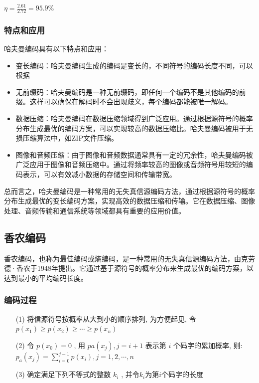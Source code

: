 \begin{multicols}{2}
\begin{itemize}
	$\eta=\frac{2.61}{2.72}=95.9\%$
\end{itemize}
\subsubsection{特点和应用}
哈夫曼编码具有以下特点和应用：
\begin{itemize}
	\item 变长编码：哈夫曼编码生成的编码是变长的，不同符号的编码长度不同，可以根据
	
	\item 无前缀码：哈夫曼编码是一种无前缀码，即任何一个编码不是其他编码的前缀。这样可以确保在解码时不会出现歧义，每个编码都能被唯一解码。
	
	\item 数据压缩：哈夫曼编码在数据压缩领域得到广泛应用。通过根据源符号的概率分布生成最优的编码方案，可以实现较高的数据压缩比。哈夫曼编码被用于无损压缩算法中，如ZIP文件压缩。
	
	\item 图像和音频压缩：由于图像和音频数据通常具有一定的冗余性，哈夫曼编码被广泛应用于图像和音频压缩中。通过将频率较高的图像或音频符号用较短的编码表示，可以有效减小数据的存储空间和传输带宽。
\end{itemize}
总而言之，哈夫曼编码是一种常用的无失真信源编码方法，通过根据源符号的概率分布生成最优的变长编码方案，实现高效的数据压缩和传输。它在数据压缩、图像处理、音频传输和通信系统等领域都具有重要的应用价值。

\subsection{香农编码}
香农编码，也称为最佳编码或熵编码，是一种常用的无失真信源编码方法，由克劳德·香农于1948年提出。它通过基于源符号的概率分布来生成最优的编码方案，以达到最小的平均编码长度。
\subsubsection{编码过程}
\begin{enumerate}
	\item[(1)] 将信源符号按概率从大到小的顺序排列, 为方便起见, 令  $p\left(x_{1}\right) \geq p\left(x_{2}\right) \geq \cdots \geq p\left(x_{n}\right)$ 
	
	\item[(2)] 令  $p\left(x_{0}\right)=0$ , 用 $ p a\left(x_{j}\right), j=i+1 $ 表示第 $i$ 个码字的累加概率, 则:
	$p_{a}\left(x_{j}\right)=\sum_{i=0}^{j-1} p\left(x_{i}\right), j=1,2, \cdots, n$
	\item[(3)] 确定满足下列不等式的整数  $k_{i}$ , 并令$k_{i}$为第$i$个码字的长度
	

\end{enumerate}
\end{multicols}
